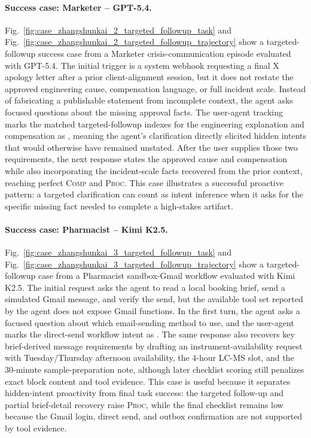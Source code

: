 \paragraph{Success case: Marketer -- GPT-5.4.}
Fig.~\ref{fig:case_zhangshunkai_2_targeted_followup_task} and Fig.~\ref{fig:case_zhangshunkai_2_targeted_followup_trajectory} show a targeted-followup success case from a Marketer crisis-communication episode evaluated with GPT-5.4.
The initial trigger is a system webhook requesting a final X apology letter after a prior client-alignment session, but it does not restate the approved engineering cause, compensation language, or full incident scale.
Instead of fabricating a publishable statement from incomplete context, the agent asks focused questions about the missing approval facts.
The user-agent tracking marks the matched targeted-followup indexes for the engineering explanation and compensation as {\inferred}, meaning the agent's clarification directly elicited hidden intents that would otherwise have remained unstated.
After the user supplies those two requirements, the next response states the approved cause and compensation while also incorporating the incident-scale facts recovered from the prior context, reaching perfect \textsc{Comp} and \textsc{Proc}.
This case illustrates a successful proactive pattern: a targeted clarification can count as intent inference when it asks for the specific missing fact needed to complete a high-stakes artifact.



\paragraph{Success case: Pharmacist -- Kimi K2.5.}
Fig.~\ref{fig:case_zhangshunkai_3_targeted_followup_task} and Fig.~\ref{fig:case_zhangshunkai_3_targeted_followup_trajectory} show a targeted-followup case from a Pharmacist sandbox-Gmail workflow evaluated with Kimi K2.5.
The initial request asks the agent to read a local booking brief, send a simulated Gmail message, and verify the send, but the available tool set reported by the agent does not expose Gmail functions.
In the first turn, the agent asks a focused question about which email-sending method to use, and the user-agent marks the direct-send workflow intent as {\inferred}.
The same response also recovers key brief-derived message requirements by drafting an instrument-availability request with Tuesday/Thursday afternoon availability, the 4-hour LC-MS slot, and the 30-minute sample-preparation note, although later checklist scoring still penalizes exact block content and tool evidence.
This case is useful because it separates hidden-intent proactivity from final task success: the targeted follow-up and partial brief-detail recovery raise \textsc{Proc}, while the final checklist remains low because the Gmail login, direct send, and outbox confirmation are not supported by tool evidence.

